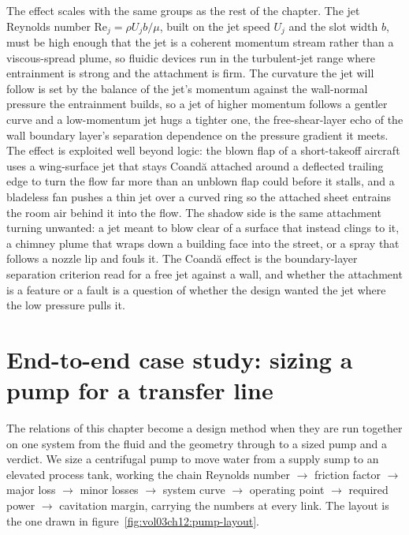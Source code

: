 The effect scales with the same groups as the rest of the chapter. The
jet Reynolds number $\text{Re}_j = \rho U_j b/\mu$, built on the jet
speed $U_j$ and the slot width $b$, must be high enough that the jet is a
coherent momentum stream rather than a viscous-spread plume, so fluidic
devices run in the turbulent-jet range where entrainment is strong and
the attachment is firm. The curvature the jet will follow is set by the
balance of the jet's momentum against the wall-normal pressure the
entrainment builds, so a jet of higher momentum follows a gentler curve
and a low-momentum jet hugs a tighter one, the free-shear-layer echo of
the wall boundary layer's separation dependence on the pressure gradient
it meets. The effect is exploited well beyond logic: the blown flap of a
short-takeoff aircraft uses a wing-surface jet that stays Coand\u{a}
attached around a deflected trailing edge to turn the flow far more than
an unblown flap could before it stalls, and a bladeless fan pushes a thin
jet over a curved ring so the attached sheet entrains the room air behind
it into the flow. The shadow side is the same attachment turning
unwanted: a jet meant to blow clear of a surface that instead clings to
it, a chimney plume that wraps down a building face into the street, or a
spray that follows a nozzle lip and fouls it. The Coand\u{a} effect is
the boundary-layer separation criterion read for a free jet against a
wall, and whether the attachment is a feature or a fault is a question of
whether the design wanted the jet where the low pressure pulls it.

\section{End-to-end case study: sizing a pump for a transfer line}

The relations of this chapter become a design method when they are
run together on one system from the fluid and the geometry through to
a sized pump and a verdict. We size a centrifugal pump to move water
from a supply sump to an elevated process tank, working the chain
Reynolds number $\to$ friction factor $\to$ major loss $\to$ minor
losses $\to$ system curve $\to$ operating point $\to$ required power
$\to$ cavitation margin, carrying the numbers at every link. The
layout is the one drawn in figure~\ref{fig:vol03ch12:pump-layout}.

